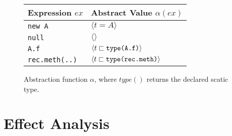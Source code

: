 \documentclass[a4paper]{article}
\newcommand{\subtype}{\sqsubset}
\begin{document}
\begin{figure}[h]
    \centering

    \begin{tabular}{ l | l }
        Expression $ex$       & Abstract Value $\alpha(ex)$\\
        \hline
        \verb/new A/          & $\langle t = A \rangle$ \\
        \verb/null/           & $\langle \rangle$ \\
        \verb/A.f/            & $\langle t \subtype \verb/type(A.f)/ \rangle$ \\
        \verb/rec.meth(..)/   & $\langle t \subtype \verb/type(rec.meth)/ \rangle$ \\
    \end{tabular}

    \caption{Abstraction function $\alpha$, where $type()$ returns the declared
    scatic type.}
    \label{fig:ta:tf}
\end{figure}

\section{Effect Analysis}
\end{document}
